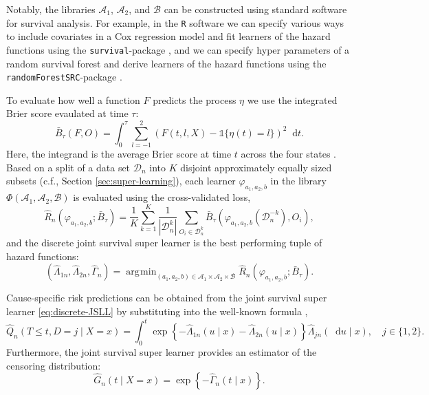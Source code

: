\documentclass[alpha-refs]{wiley-article}
\renewcommand{\phi}{\varphi}
\newcommand*\diff{\mathop{}\!\mathrm{d}}
\newcommand{\1}{\mathds{1}}
\DeclareMathOperator*{\argmin}{\arg\!\min}
\newcommand{\data}{\ensuremath{\mathcal{D}}}
\begin{document}
  Notably, the libraries \( \mathcal{A}_1 \), \(
\mathcal{A}_2 \), and \( \mathcal{B} \) can be constructed using
standard software for survival analysis.  For example, in the
\texttt{R} software we can specify various ways to include covariates
in a Cox regression model and fit learners of the hazard functions
using the \texttt{survival}-package \citep{survival-package}, and we
can specify hyper parameters of a random survival forest and derive
learners of the hazard functions using the
\texttt{randomForestSRC}-package \citep{randomForestSRC}.

To evaluate how well a function \( F \) predicts the
process $\eta$ we use the integrated Brier score \citep{graf1999assessment}
evaulated at time \(\tau\):
\begin{equation*}
  \bar B_\tau(F,O) = \int_0^{\tau} \sum_{l=-1}^{2}
  \left(
      F(t,l,X) - \1{\{\eta(t)=l\}}
  \right)^2\diff t.
\end{equation*}
Here, the integrand is the average Brier score at time \(t\) across
the four states \citep{brier1950verification}. Based on a split of a
data set \(\data_n\) into $K$ disjoint approximately equally sized
subsets (c.f., Section \ref{sec:super-learning}), each learner \(
\phi_{a_1, a_2, b} \) in the library \( \Phi(\mathcal{A}_1,
\mathcal{A}_2, \mathcal{B}) \) is evaluated using the cross-validated
loss,
\begin{equation*}
  \hat{R}_{n}(\phi_{a_1,a_2,b} ; \bar{B}_{\tau}) =
  \frac{1}{K}\sum_{k=1}^{K}
  \frac{1}{| \data_n^{k} |}\sum_{O_i \in \data_n^{k}}
  \bar B_\tau
  {
    \left(
      \phi_{a_1,a_2,b}{ (\data_n^{-k})}
      , O_i
    \right)
  },
\end{equation*}
and the discrete joint survival super learner is the best performing tuple of hazard functions:
\begin{equation}\label{eq:discrete-JSLL}
  (\hat \Lambda_{1n},\hat \Lambda_{2n}, \hat \Gamma_{n})
  =  \argmin_{(a_1,a_2,b)\in \mathcal{A}_1\times\mathcal{A}_2\times\mathcal{B}}
    \hat{R}_{n}(\phi_{a_1,a_2,b} ; \bar{B}_{\tau}).
\end{equation}
  
Cause-specific risk predictions can be obtained from
the joint survival super learner \eqref{eq:discrete-JSLL} by
substituting into the well-known formula
\citep[e.g.,][]{benichou1990estimates, ozenne2017riskregression},
\begin{equation}
  \label{eq:cs-risk-def} \hat Q_n(T \leq t, D = j \mid X=x) = \int_0^t
\exp\left\{-\hat\Lambda_{1n}(u \mid x)-\hat\Lambda_{2n}(u \mid
x)\right\} \hat\Lambda_{jn}(\diff u \mid x), \quad j \in \{1,2\}.
\end{equation} Furthermore, the joint survival super learner provides an
estimator of the censoring distribution:
\begin{equation*}
 \hat G_n(t \mid X=x) = \exp\left\{-\hat\Gamma_n(t \mid x)\right\}.
\end{equation*}
\end{document}
